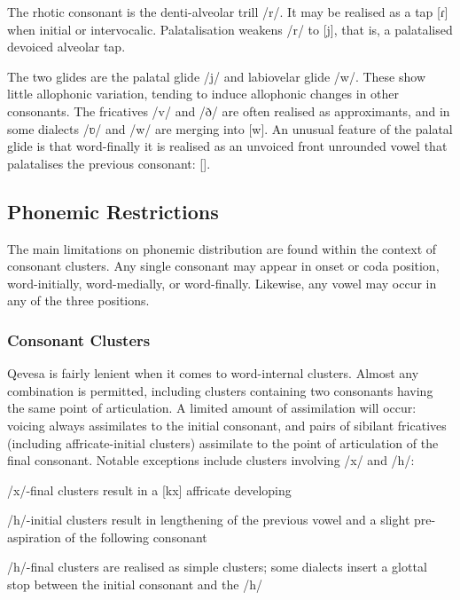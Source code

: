 \documentclass[grammar]{subfiles}
\begin{document}
	The rhotic consonant is the denti-alveolar trill /r/. It may be realised as a tap [ɾ] when initial or intervocalic. Palatalisation weakens /r/ to [j], that is, a palatalised devoiced alveolar tap.

	The two glides are the palatal glide /j/ and labiovelar glide /w/. These show little allophonic variation, tending to induce allophonic changes in other consonants. The fricatives /v/ and /ð/ are often realised as approximants, and in some dialects /ʋ/ and /w/ are merging into [w]. An unusual feature of the palatal glide is that word-finally it is realised as an unvoiced front unrounded vowel that palatalises the previous consonant: [].

	\subsection{Phonemic Restrictions}
	\label{ssec:phonemic_restrictions}

	The main limitations on phonemic distribution are found within the context of consonant clusters. Any single consonant may appear in onset or coda position, word-initially, word-medially, or word-finally. Likewise, any vowel may occur in any of the three positions. 

	\subsubsection{Consonant Clusters}
	\label{sssec:consonant_clusters}

	Qevesa is fairly lenient when it comes to word-internal clusters. Almost any combination is permitted, including clusters containing two consonants having the same point of articulation. A limited amount of assimilation will occur: voicing always assimilates to the initial consonant, and pairs of sibilant fricatives (including affricate-initial clusters) assimilate to the point of articulation of the final consonant. Notable exceptions include clusters involving /x/ and /h/: 

	\begin{itemize*}
	\item /x/-final clusters result in a [kx] affricate developing
	\item /h/-initial clusters result in lengthening of the previous vowel and a slight pre-aspiration of the following consonant
	\item /h/-final clusters are realised as simple clusters; some dialects insert a glottal stop between the initial consonant and the /h/
	\end{itemize*}
\end{document}
